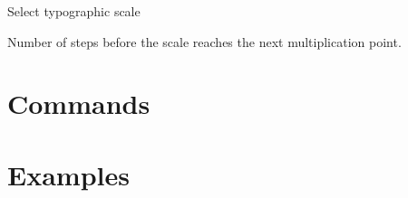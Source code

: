 \documentclass{ltxdoc}
\begin{document}
\noindent {} Select typographic scale

\noindent {} Number of steps before the scale reaches the next multiplication point.

\noindent {} 

\noindent {} 




\section{Commands}

\DescribeMacro\setsizes
\cmd\setsizes{}


\section{Examples}
\end{document}
